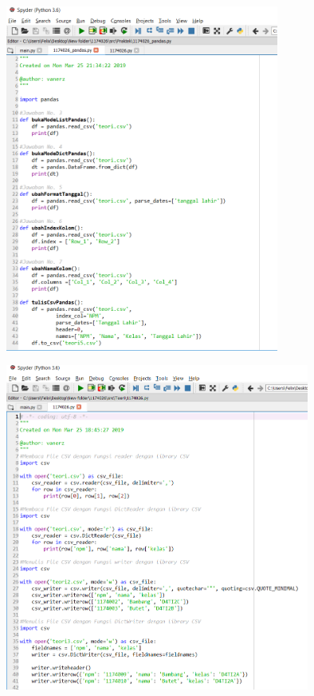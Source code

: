 \begin{figure}[H]
	\includegraphics[width=9cm]{figures/4/1174026/Praktek/k4.png}
	\centering
\end{figure}
\begin{figure}[H]
	\includegraphics[width=10cm]{figures/4/1174026/Praktek/k5.png}
	\centering
\end{figure}

